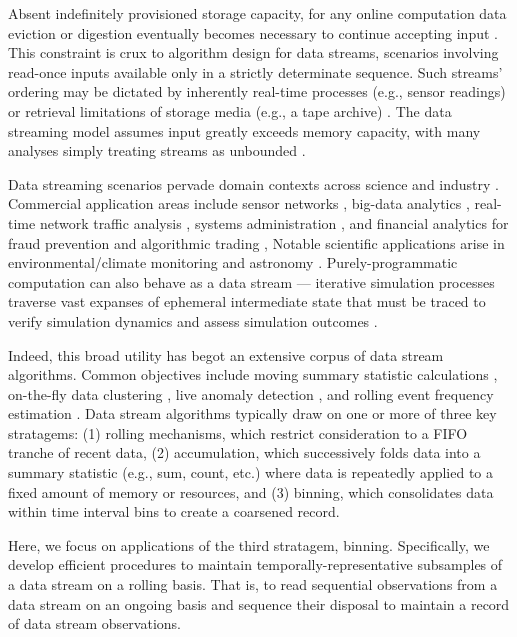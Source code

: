 Absent indefinitely provisioned storage capacity, for any online computation data eviction or digestion eventually becomes necessary to continue accepting input \citep{gaber2005mining}.
This constraint is crux to algorithm design for data streams, scenarios involving read-once inputs available only in a strictly determinate sequence.
Such streams' ordering may be dictated by inherently real-time processes (e.g., sensor readings) or retrieval limitations of storage media (e.g., a tape archive) \citep{henzinger1998computing}.
The data streaming model assumes input greatly exceeds memory capacity, with many analyses simply treating streams as unbounded \citep{jiang2006research}.

Data streaming scenarios pervade domain contexts across science and industry \citep{aggarwal2009data,akidau2015dataflow}.
Commercial application areas include sensor networks \citep{elnahrawy2003research}, big-data analytics \citep{he2010comet}, real-time network traffic analysis \citep{johnson2005streams,muthukrishnan2005data}, systems administration \citep{fischer2012real}, and financial analytics for fraud prevention and algorithmic trading \citep{rajeshwari2016real,agarwal2009faster},
Notable scientific applications arise in environmental/climate monitoring \citep{hill2009real} and astronomy \citep{graham2012data}.
Purely-programmatic computation can also behave as a data stream --- iterative simulation processes traverse vast expanses of ephemeral intermediate state that must be traced to verify simulation dynamics and assess simulation outcomes \citep{abdulla2004simulation,schutzel2014stream}.

Indeed, this broad utility has begot an extensive corpus of data stream algorithms.
Common objectives include moving summary statistic calculations \citep{lin2004continuously}, on-the-fly data clustering \citep{silva2013data}, live anomaly detection \citep{cai2004maids}, and rolling event frequency estimation \citep{manku2002approximate}.
Data stream algorithms typically draw on one or more of three key stratagems: (1) rolling mechanisms, which restrict consideration to a FIFO tranche of recent data, (2) accumulation, which successively folds data into a summary statistic (e.g., sum, count, etc.) where data is repeatedly applied to a fixed amount of memory or resources, and (3) binning, which consolidates data within time interval bins to create a coarsened record.

Here, we focus on applications of the third stratagem, binning.
Specifically, we develop efficient procedures to maintain temporally-representative subsamples of a data stream on a rolling basis.
That is, to read sequential observations from a data stream on an ongoing basis and sequence their disposal to maintain a record of data stream observations.

